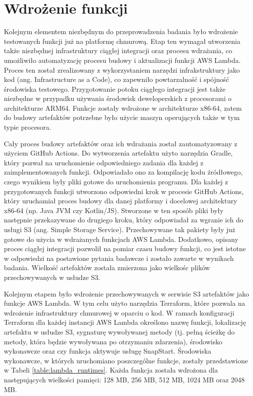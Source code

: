 \section{Wdrożenie funkcji}\label{chapter:wdrożenie_funkcji}

Kolejnym elementem niezbędnym do przeprowadzenia badania było wdrożenie testowanych funkcji już na platformę chmurową.
Etap ten wymagał utworzenia także niezbędnej infrastruktury ciągłej integracji oraz procesu wdrażania, co umożliwiło automatyzację procesu budowy i aktualizacji funkcji AWS Lambda. 
Proces ten został zrealizowany z wykorzystaniem narzędzi infrakstruktury jako kod (ang. Infrastructure as a Code), co zapewniło powtarzalność i spójność środowiska testowego.
Przygotowanie potoku ciągłego integracji jest także niezbędne w przypadku używania środowisk deweloperskich z procesorami o architekturze ARM64.
Funkcje zostały wdrożone w architekturze x86-64, zatem do budowy artefaktów potrzebne było użycie maszyn operujących także w tym typie procesora.

Cały proces budowy artefaktów oraz ich wdrażania został zautomatyzowany z użyciem GitHub Actions.
Do wytworzenia artefaktu użyto narzędzia Gradle, który pozwał na uruchomienie odpowiedniego zadania dla każdej z zaimplementowanych funkcji.
Odpowiadało ono za kompilację kodu źródłowego, czego wynikiem były pliki gotowe do uruchomienia programu.
Dla każdej z przygotowanych funkcji utworzono odpowiedni krok w procesie GitHub Actions, który uruchamiał proces budowy dla danej platformy i docelowej architektury x86-64 (np. Java JVM czy Kotlin/JS).
Stworzone w ten sposób pliki były następnie przekazywane do drugiego kroku, który odpowiadał za wgranie ich do usługi S3 (ang. Simple Storage Service).
Przechowywane tak pakiety były już gotowe do użycia w wdrażanych funkcjach AWS Lambda.
Dodatkowo, opisany proces ciągłej integracji pozwolił na pomiar czasu budowy funkcji, co jest istotne w odpowiedzi na postawione pytania badawcze i zostało zawarte w wynikach badania.
Wielkość artefaktów została zmierzona jako wielkośc plików przechowywanych w usłudze S3.

Kolejnym etapem było wdrożenie przechowywanych w serwisie S3 artefaktów jako funkcje AWS Lambda.
W tym celu użyto narzędzia Terraform, które pozwala na wdrożenie infrastruktury chmurowej w oparciu o kod.
W ramach konfiguracji Terraform dla każdej instancji AWS Lambda określono nazwę funkcji, lokalizację artefaktu w usłudze S3, sygnaturę wywoływanej metody (tj. pełną ścieżkę do metody, która będzie wywoływana po otrzymaniu zdarzenia), środowisko wykonawcze oraz czy funkcja aktywuje usługę SnapStart.
Środowiska wykonawcze, w których uruchomiano poszczególne funkcje, zostały przedstawione w Tabeli \ref{table:lambda_runtimes}.
Każda funkcja została wdrożona dla następujących wielkości pamięci: 128 MB, 256 MB, 512 MB, 1024 MB oraz 2048 MB.

